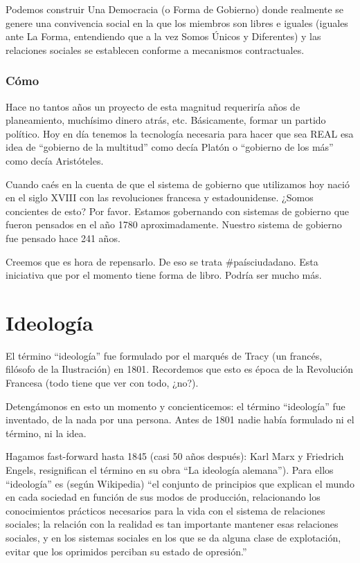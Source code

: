\documentclass[
]{book}
\begin{document}
Podemos construir Una Democracia (o Forma de Gobierno) donde realmente se genere una convivencia social en la que los miembros son libres e iguales (iguales ante La Forma, entendiendo que a la vez Somos Únicos y Diferentes) y las relaciones sociales se establecen conforme a mecanismos contractuales.

\hypertarget{cuxf3mo}{%
\subsection{Cómo}\label{cuxf3mo}}

Hace no tantos años un proyecto de esta magnitud requeriría años de planeamiento, muchísimo dinero atrás, etc. Básicamente, formar un partido político. Hoy en día tenemos la tecnología necesaria para hacer que sea REAL esa idea de ``gobierno de la multitud'' como decía Platón o ``gobierno de los más'' como decía Aristóteles.

Cuando caés en la cuenta de que el sistema de gobierno que utilizamos hoy nació en el siglo XVIII con las revoluciones francesa y estadounidense. ¿Somos concientes de esto? Por favor. Estamos gobernando con sistemas de gobierno que fueron pensados en el año 1780 aproximadamente. Nuestro sistema de gobierno fue pensado hace 241 años.

Creemos que es hora de repensarlo. De eso se trata \#paísciudadano. Esta iniciativa que por el momento tiene forma de libro. Podría ser mucho más.

\hypertarget{ideologuxeda}{%
\chapter{Ideología}\label{ideologuxeda}}

El término ``ideología'' fue formulado por el marqués de Tracy (un francés, filósofo de la Ilustración) en 1801. Recordemos que esto es época de la Revolución Francesa (todo tiene que ver con todo, ¿no?).

Detengámonos en esto un momento y concienticemos: el término ``ideología'' fue inventado, de la nada por una persona. Antes de 1801 nadie había formulado ni el término, ni la idea.

Hagamos fast-forward hasta 1845 (casi 50 años después): Karl Marx y Friedrich Engels, resignifican el término en su obra ``La ideología alemana''). Para ellos ``ideología'' es (según Wikipedia) ``el conjunto de principios que explican el mundo en cada sociedad en función de sus modos de producción, relacionando los conocimientos prácticos necesarios para la vida con el sistema de relaciones sociales; la relación con la realidad es tan importante mantener esas relaciones sociales, y en los sistemas sociales en los que se da alguna clase de explotación, evitar que los oprimidos perciban su estado de opresión.''
\end{document}
